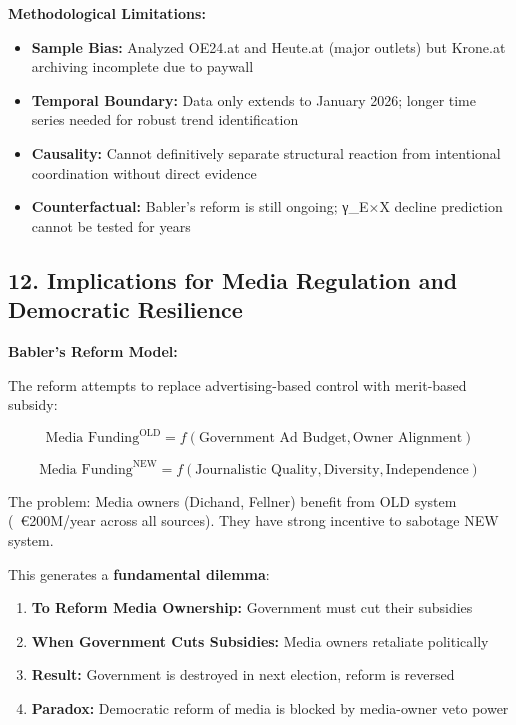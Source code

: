 \textbf{Methodological Limitations:}

\begin{itemize}
\item \textbf{Sample Bias:} Analyzed OE24.at and Heute.at (major outlets)
  but Krone.at archiving incomplete due to paywall
\item \textbf{Temporal Boundary:} Data only extends to January 2026;
  longer time series needed for robust trend identification
\item \textbf{Causality:} Cannot definitively separate structural reaction
  from intentional coordination without direct evidence
\item \textbf{Counterfactual:} Babler's reform is still ongoing;
  γ_{E×X} decline prediction cannot be tested for years
\end{itemize}

\label{sec:dx-policy}

\subsection*{12. Implications for Media Regulation and Democratic Resilience}

\textbf{Babler's Reform Model:}

The reform attempts to replace advertising-based control with merit-based subsidy:

\[
\text{Media Funding}^{\text{OLD}} = f(\text{Government Ad Budget}, \text{Owner Alignment})
\]

\[
\text{Media Funding}^{\text{NEW}} = f(\text{Journalistic Quality}, \text{Diversity}, \text{Independence})
\]

The problem: Media owners (Dichand, Fellner) benefit from OLD system (~€200M/year
across all sources). They have strong incentive to sabotage NEW system.

This generates a \textbf{fundamental dilemma}:

\begin{enumerate}
\item \textbf{To Reform Media Ownership:} Government must cut their subsidies
\item \textbf{When Government Cuts Subsidies:} Media owners retaliate politically
\item \textbf{Result:} Government is destroyed in next election, reform is reversed
\item \textbf{Paradox:} Democratic reform of media is blocked by media-owner veto power
\end{enumerate}

